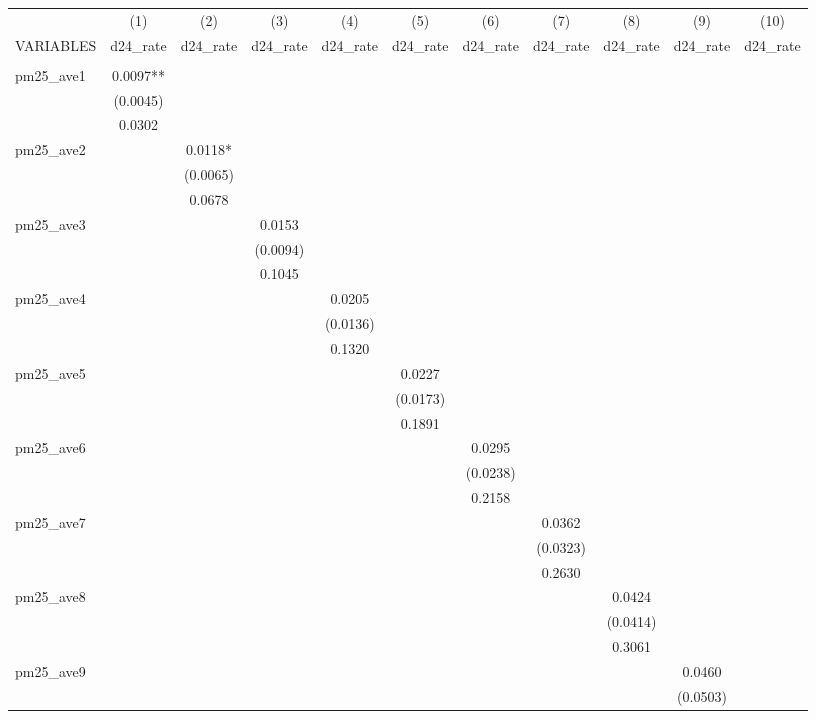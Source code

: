\begin{tabular}{lcccccccccc} \hline
 & (1) & (2) & (3) & (4) & (5) & (6) & (7) & (8) & (9) & (10) \\
VARIABLES & d24\_rate & d24\_rate & d24\_rate & d24\_rate & d24\_rate & d24\_rate & d24\_rate & d24\_rate & d24\_rate & d24\_rate \\ \hline
 &  &  &  &  &  &  &  &  &  &  \\
pm25\_ave1 & 0.0097** &  &  &  &  &  &  &  &  &  \\
 & (0.0045) &  &  &  &  &  &  &  &  &  \\
 & 0.0302 &  &  &  &  &  &  &  &  &  \\
pm25\_ave2 &  & 0.0118* &  &  &  &  &  &  &  &  \\
 &  & (0.0065) &  &  &  &  &  &  &  &  \\
 &  & 0.0678 &  &  &  &  &  &  &  &  \\
pm25\_ave3 &  &  & 0.0153 &  &  &  &  &  &  &  \\
 &  &  & (0.0094) &  &  &  &  &  &  &  \\
 &  &  & 0.1045 &  &  &  &  &  &  &  \\
pm25\_ave4 &  &  &  & 0.0205 &  &  &  &  &  &  \\
 &  &  &  & (0.0136) &  &  &  &  &  &  \\
 &  &  &  & 0.1320 &  &  &  &  &  &  \\
pm25\_ave5 &  &  &  &  & 0.0227 &  &  &  &  &  \\
 &  &  &  &  & (0.0173) &  &  &  &  &  \\
 &  &  &  &  & 0.1891 &  &  &  &  &  \\
pm25\_ave6 &  &  &  &  &  & 0.0295 &  &  &  &  \\
 &  &  &  &  &  & (0.0238) &  &  &  &  \\
 &  &  &  &  &  & 0.2158 &  &  &  &  \\
pm25\_ave7 &  &  &  &  &  &  & 0.0362 &  &  &  \\
 &  &  &  &  &  &  & (0.0323) &  &  &  \\
 &  &  &  &  &  &  & 0.2630 &  &  &  \\
pm25\_ave8 &  &  &  &  &  &  &  & 0.0424 &  &  \\
 &  &  &  &  &  &  &  & (0.0414) &  &  \\
 &  &  &  &  &  &  &  & 0.3061 &  &  \\
pm25\_ave9 &  &  &  &  &  &  &  &  & 0.0460 &  \\
 &  &  &  &  &  &  &  &  & (0.0503) &  \\

\end{tabular}
